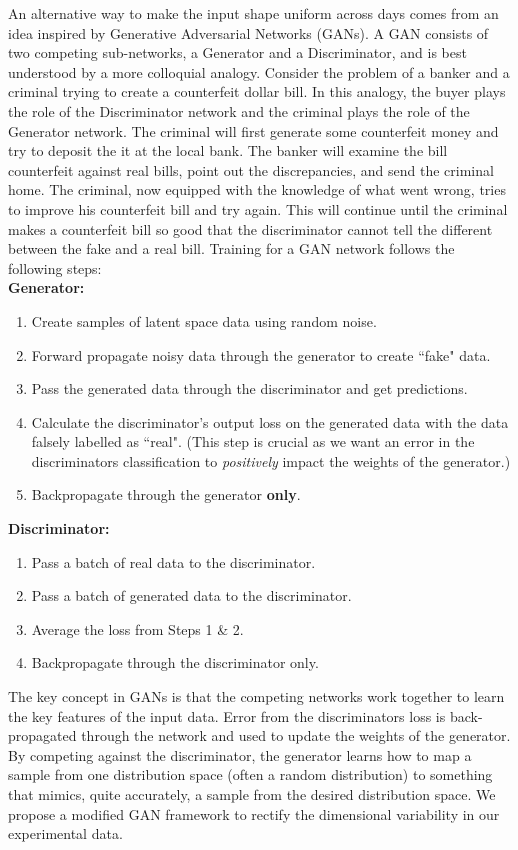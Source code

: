 \documentclass[12pt]{article}
\begin{document}
\indent An alternative way to make the input shape uniform across days comes from an idea inspired by Generative Adversarial Networks (GANs). A GAN consists of two competing sub-networks, a Generator and a Discriminator, and is best understood by a more colloquial analogy. Consider the problem of a banker and a criminal trying to create a counterfeit dollar bill. In this analogy, the buyer plays the role of the Discriminator network and the criminal plays the role of the Generator network. The criminal will first generate some counterfeit money and try to deposit the it at the local bank. The banker will examine the bill counterfeit against real bills, point out the discrepancies, and send the criminal home. The criminal, now equipped with the knowledge of what went wrong, tries to improve his counterfeit bill and try again. This will continue until the criminal makes a counterfeit bill so good that the discriminator cannot tell the different between the fake and a real bill. Training for a GAN network follows the following steps:  \\
\textbf{Generator:} \\
\begin{enumerate}
  \item Create samples of latent space data using random noise.
  \item Forward propagate noisy data through the generator to create ``fake" data.
  \item Pass the generated data through the discriminator and get predictions.
  \item Calculate the discriminator's output loss on the generated data with the data falsely labelled as ``real". (This step is crucial as we want an error in the discriminators classification to \textit{positively} impact the weights of the generator.)
  \item Backpropagate through the generator \textbf{only}.
  \end{enumerate}
  \textbf{Discriminator:} \\
  \begin{enumerate}
    \item Pass a batch of real data to the discriminator.
    \item Pass a batch of generated data to the discriminator.
    \item Average the loss from Steps 1 \& 2.
    \item Backpropagate through the discriminator only.
  \end{enumerate}
\indent The key concept in GANs is that the competing networks work together to learn the key features of the input data. Error from the discriminators loss is back-propagated through the network and used to update the weights of the generator. By competing against the discriminator, the generator learns how to map a sample from one distribution space (often a random distribution) to something that mimics, quite accurately, a sample from the desired distribution space. We propose a modified GAN framework to rectify the dimensional variability in our experimental data. \\
\end{document}
